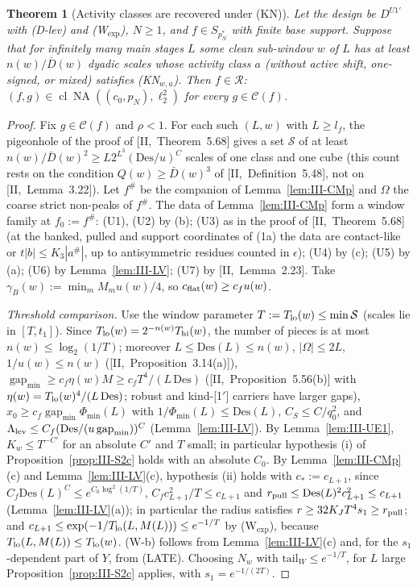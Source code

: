 \documentclass[10pt]{amsart}
\newtheorem{theorem}{Theorem}[section]
\theoremstyle{definition}
\theoremstyle{remark}
\newcommand{\NA}{\operatorname{NA}}
\newcommand{\Cset}{\mathcal C}
\newcommand{\cl}{\operatorname{cl}}
\newcommand{\gap}{\operatorname{gap}}
\newcommand{\Rec}{\mathcal R}
\begin{document}
\begin{theorem}[Activity classes are recovered under (KN)]\label{thm:III-Cmix}
Let the design be $D^{U1'}$ with \textup{(D-lev)} and \textup{(W$_{\exp}$)}, $N\ge1$,
and $f\in S_{p_N^*}$ with finite base support.  Suppose that for infinitely many
main stages $L$ some clean sub-window $w$ of $L$ has at least $n(w)/\bar D(w)$
dyadic scales whose activity class $a$ \textup{(}without active shift, one-signed,
or mixed\textup{)} satisfies \textup{(KN$_{w,a}$)}.  Then $f\in\Rec$:
$(f,g)\in\cl\NA((c_0,p_N),\ell_2^2)$ for every $g\in\Cset(f)$.
\end{theorem}

\begin{proof}
Fix $g\in\Cset(f)$ and $\rho<1$.  For each such $(L,w)$ with $L\ge l_f$, the
pigeonhole of the proof of [II,~Theorem~5.68] gives a set $\mathcal S$ of at least
$n(w)/\bar D(w)^2\ge L2^{L^3}(\mathrm{Des}/u)^C$ scales of one class and one cube
(this count rests on the condition $Q(w)\ge\bar D(w)^3$ of
[II,~Definition~5.48], not on [II,~Lemma~3.22]).
Let $f^\#$ be the companion of Lemma~\ref{lem:III-CMp} and $\Omega$ the coarse
strict non-peaks of $f^\#$.  The data of Lemma~\ref{lem:III-CMp} form a window family
at $f_0:=f^\#$: (U1), (U2) by (b); (U3) as in the proof of [II,~Theorem~5.68] (at
the banked, pulled and support coordinates of (1a) the data are contact-like or
$t|b|\le K_3|a^\#|$, up to antisymmetric residues counted in $\epsilon$); (U4) by
(c); (U5) by (a); (U6) by Lemma~\ref{lem:III-LV}; (U7) by [II,~Lemma~2.23].  Take
$\gamma_B(w):=\min_mM_mu(w)/4$, so $c_{\rm flat}(w)\ge c_fu(w)$.

\emph{Threshold comparison.}  Use the window parameter $T:=T_{\rm lo}(w)\le
\min\mathcal S$ (scales lie in $[T,t_1]$).  Since $T_{\rm lo}(w)=2^{-n(w)}
T_{\rm hi}(w)$, the number of pieces is at most $n(w)\le\log_2(1/T)$; moreover
$L\le\mathrm{Des}(L)\le n(w)$, $|\Omega|\le2L$, $1/u(w)\le n(w)$
([II,~Proposition~3.14(a)]), $\gap_{\min}\ge c_f\eta(w)M\ge c_fT^4/(L\,\mathrm{Des})$
([II,~Proposition~5.56(b)] with $\eta(w)=T_{\rm lo}(w)^4/(L\,\mathrm{Des})$; robust
and kind-[1$'$] carriers have larger gaps), $x_0\ge c_f\gap_{\min}\Phi_{\min}(L)$
with $1/\Phi_{\min}(L)\le\mathrm{Des}(L)$, $C_S\le C/q_0^2$, and
$\Lambda_{\rm lev}\le C_f(\mathrm{Des}/(u\gap_{\min}))^C$ (Lemma~\ref{lem:III-LV}).  By
Lemma~\ref{lem:III-UE1}, $K_w\le T^{-C'}$ for an absolute $C'$ and $T$ small; in
particular hypothesis (i) of Proposition~\ref{prop:III-S2c} holds with an
absolute $C_0$.  By Lemma~\ref{lem:III-CMp}(c) and Lemma~\ref{lem:III-LV}(c),
hypothesis (ii) holds with $c_*:=c_{L+1}$, since $C_f\mathrm{Des}(L)^C\le
e^{C_0\log^2(1/T)}$, $C_fc_{L+1}^2/T\le c_{L+1}$ and $r_{\rm pull}\le
\mathrm{Des}(L)^2c_{L+1}^2\le c_{L+1}$ (Lemma~\ref{lem:III-LV}(a)); in particular
the radius satisfies $r\ge32K_JT^4s_1\ge r_{\rm pull}$; and $c_{L+1}\le
\exp(-1/T_{\rm lo}(L,M(L)))\le e^{-1/T}$ by (W$_{\exp}$), because
$T_{\rm lo}(L,M(L))\le T_{\rm lo}(w)$.  (W-b) follows from
Lemma~\ref{lem:III-LV}(c) and, for the $s_1$-dependent part of $Y$, from (LATE).
Choosing $N_w$ with $\mathrm{tail}_W\le e^{-1/T}$, for $L$ large
Proposition~\ref{prop:III-S2c} applies, with $s_1=e^{-1/(2T)}$.


\end{proof}
\end{document}
